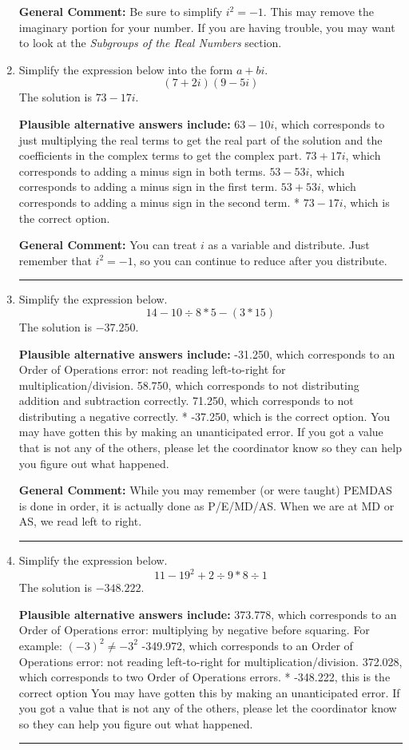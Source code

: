 \documentclass{extbook}[14pt]
\newcommand{\litem}[1]{\item #1

\rule{\textwidth}{0.4pt}}
\begin{document}
\begin{enumerate}
{\textbf{General Comment:} Be sure to simplify $i^2 = -1$. This may remove the imaginary portion for your number. If you are having trouble, you may want to look at the \textit{Subgroups of the Real Numbers} section.
}
\litem{
Simplify the expression below into the form $a+bi$.
\[ (7 + 2 i)(9 - 5 i) \]The solution is \( 73 - 17 i \).\begin{enumerate}[label=\Alph*.]
\textbf{Plausible alternative answers include:} $63 - 10 i$, which corresponds to just multiplying the real terms to get the real part of the solution and the coefficients in the complex terms to get the complex part.
 $73 + 17 i$, which corresponds to adding a minus sign in both terms.
 $53 - 53 i$, which corresponds to adding a minus sign in the first term.
 $53 + 53 i$, which corresponds to adding a minus sign in the second term.
* $73 - 17 i$, which is the correct option.
\end{enumerate}

\textbf{General Comment:} You can treat $i$ as a variable and distribute. Just remember that $i^2=-1$, so you can continue to reduce after you distribute.
}
\litem{
Simplify the expression below.
\[ 14 - 10 \div 8 * 5 - (3 * 15) \]The solution is \( -37.250 \).\begin{enumerate}[label=\Alph*.]
\textbf{Plausible alternative answers include:} -31.250, which corresponds to an Order of Operations error: not reading left-to-right for multiplication/division.
 58.750, which corresponds to not distributing addition and subtraction correctly.
 71.250, which corresponds to not distributing a negative correctly.
* -37.250, which is the correct option.
 You may have gotten this by making an unanticipated error. If you got a value that is not any of the others, please let the coordinator know so they can help you figure out what happened.
\end{enumerate}

\textbf{General Comment:} While you may remember (or were taught) PEMDAS is done in order, it is actually done as P/E/MD/AS. When we are at MD or AS, we read left to right.
}
\litem{
Simplify the expression below.
\[ 11 - 19^2 + 2 \div 9 * 8 \div 1 \]The solution is \( -348.222 \).\begin{enumerate}[label=\Alph*.]
\textbf{Plausible alternative answers include:} 373.778, which corresponds to an Order of Operations error: multiplying by negative before squaring. For example: $(-3)^2 \neq -3^2$
 -349.972, which corresponds to an Order of Operations error: not reading left-to-right for multiplication/division.
 372.028, which corresponds to two Order of Operations errors.
* -348.222, this is the correct option
 You may have gotten this by making an unanticipated error. If you got a value that is not any of the others, please let the coordinator know so they can help you figure out what happened.
\end{enumerate}

}
\end{enumerate}
\end{document}
